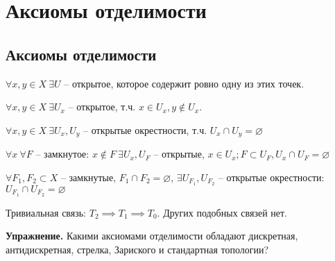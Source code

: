 \documentclass[main]{subfiles}
\begin{document}
\chapter{Аксиомы отделимости}
\section{Аксиомы отделимости}
\begin{theorem}
    $\forall x, y \in X\ \exists U$ -- открытое, которое  содержит ровно одну из этих точек.
\end{theorem}
\begin{theorem}[$T_1$]
    $\forall x, y \in X\ \exists U_x$ -- открытое, т.ч. $x\in U_x, y \not\in U_x$.
\end{theorem}
\begin{theorem}
    $\forall x,y \in X\ \exists U_x, U_y$ -- открытые окрестности, т.ч. $U_x \cap U_y = \varnothing$
\end{theorem}
\begin{theorem}[$T_3$]
    $\forall x\ \forall F$ -- замкнутое: $x \not\in F\ \exists U_x, U_F$ -- открытые,
    $x \in U_x; F \subset U_F, U_x \cap U_F = \varnothing$
\end{theorem}
\begin{theorem}[$T_4$]
    $\forall F_1, F_2 \subset X$ -- замкнутые, $F_1 \cap F_2 = \varnothing$,
    $\exists U_{F_1}, U_{F_2}$ -- открытые окрестности: $U_{F_1} \cap U_{F_2} = \varnothing$
\end{theorem}

Тривиальная связь: $T_2 \implies T_1 \implies T_0$.
Других подобных связей нет.

\textbf{Упражнение.} Какими аксиомами отделимости обладают дискретная, антидискретная, стрелка, Зариского и стандартная топологии?
\end{document}
